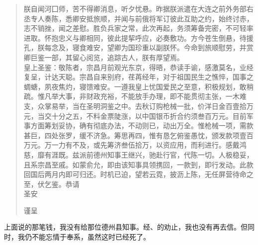 \begin{quote}
	朕自闻河囗师，苦不得卿消息，听夕忧悬。昨据朕派遣在大连之前外务部右丞专人奏陈，悉卿安抵旅顺，并闻与前俄将军订彼此互助之约，始终讨赤，志不销挫，闻之差慰。胜负兵家之常，此次再起，务须筹备完密，不可轻率进取。怀抱忠义与卿相同，彼此提挈呼应，必奏敷功。方今苍生倒悬，待援孔，朕每念及，寝食难安，望卿为国珍重以副朕怀。今命到旅顺慰劳，并赏卿巨鉴一部，其留心阅览，追踪古人，朕有厚望焉。\\

皇上圣鉴：敬陈者，宗昌月前观光东京，得晤，恭读手谕，感激莫名，业经复呈，计达天聪。宗昌自来别府，荏苒经年，对于祖国民生之憔悴，国事之蜩螗，夙夜焦灼，寝馈难安。一遵我皇上忧国爱民之至意，积极规划，敢稍疏。惟凡举大事，非财政充裕，不能放手办理，即不能贯彻主张，一木难支，众掌易举，当在圣明洞鉴之中。去秋订购枪械一批，价洋日金百壹拾万元，当交十分之五，不料金票陡涨，以中国银币折合约须叁百万元。目前军事方面筹划妥协，确有彻底办法，不动则已，动出万全。惟枪械一项，需款甚巨，四处张罗，缓不济急。筹思再四，惟有恳乞俯鉴愚忱，颁发款项壹百万元。万一力有不及，或先筹济叁伍拾万，以资应用，而利进行。感戴鸿慈，靡有涯既。兹派前德州知事王继兴，驰赴行官，代陈一切。人极稳妥，且系宗昌至戚。如蒙俞允，即由该知事具领携回，一款到，即行发动。此款回国后两月内即可归还。时机已迫，望若云霓，披沥上陈，无任屏营待命之至，伏乞鉴。恭请\\

圣安\\

\begin{flushright}
	谨呈\\
\end{flushright}
\end{quote}

上面说的那笔钱，我没有给那位德州县知事。经、的劝止，我也没有再去信。但同时，我仍不能忘情于奉系，虽然这时已经死了。\\

